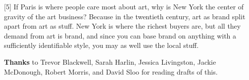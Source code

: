 [5] If Paris is where people care most about art, why is New
                  York the center of gravity of the art business? Because in the
                  twentieth century, art as brand split apart from art as stuff.
                  New York is where the richest buyers are, but all they demand
                  from art is brand, and since you can base brand on anything
                  with a sufficiently identifiable style, you may as well use
                  the local stuff.



\textbf{Thanks} to
                  Trevor Blackwell, Sarah Harlin, Jessica Livingston, Jackie
                  McDonough, Robert Morris, and David Sloo for reading drafts of
                  this.


              
            
          
